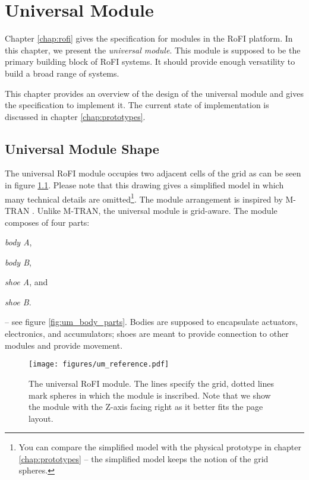 \chapter{Universal Module}\label{chap:universal_module}

Chapter \ref{chap:rofi} gives the specification for modules in the RoFI
platform. In this chapter, we present the \emph{universal module}. This module
is supposed to be the primary building block of RoFI systems. It should provide
enough versatility to build a broad range of systems.

This chapter provides an overview of the design of the universal module and
gives the specification to implement it. The current state of implementation is
discussed in chapter \ref{chap:prototypes}.

\section{Universal Module Shape}

The universal RoFI module occupies two adjacent cells of the grid as can be seen
in figure \ref{fig:um_reference}. Please note that this drawing gives a
simplified model in which many technical details are omitted\footnote{You can
compare the simplified model with the physical prototype in chapter
\ref{chap:prototypes} -- the simplified model keeps the notion of the grid
spheres.}. The module arrangement is inspired by M-TRAN
\cite{kurokawa_distributed_2008}. Unlike M-TRAN, the universal module is
grid-aware. The module composes of four parts:
\begin{enumerate*}
    \item \emph{body A},
    \item \emph{body B},
    \item \emph{shoe A}, and
    \item \emph{shoe B}.
\end{enumerate*}
-- see figure \ref{fig:um_body_parts}. Bodies are supposed to encapsulate
actuators, electronics, and accumulators; shoes are meant to provide connection
to other modules and provide movement.

\begin{figure}[t]
    \centering
    \texttt{[image: figures/um\_reference.pdf]}
    \caption{The universal RoFI module. The lines specify the grid, dotted
    lines mark spheres in which the module is inscribed. Note that we show the
    module with the Z-axis facing right as it better fits the page layout. }
    \label{fig:um_reference}
\end{figure}

